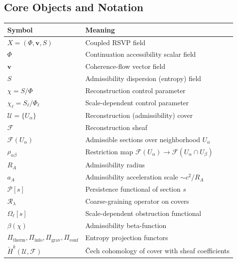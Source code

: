\documentclass[11pt, a4paper]{article}
\theoremstyle{plain}
\theoremstyle{definition}
\theoremstyle{remark}
\newcommand{\RA}{R_{\!A}}
\newcommand{\aA}{a_{\!A}}
\newcommand{\sheaf}{\mathcal{F}}
\newcommand{\cover}{\{U_\alpha\}}
\newcommand{\Ucover}{\mathcal{U}}
\newcommand{\Rcoarse}{\mathcal{R}_\lambda}
\newcommand{\Pitherm}{\Pi_{\mathrm{therm}}}
\newcommand{\Piinfo}{\Pi_{\mathrm{info}}}
\newcommand{\Pigrav}{\Pi_{\mathrm{grav}}}
\newcommand{\Piconf}{\Pi_{\mathrm{conf}}}
\newcommand{\Hcech}{\check{H}}
\begin{document}
\newpage

\subsection*{Core Objects and Notation}

\begin{center}
\renewcommand{\arraystretch}{1.4}
\begin{tabular}{@{}lp{9cm}@{}}
\toprule
\textbf{Symbol} & \textbf{Meaning} \\
\midrule
$X = (\Phi, \mathbf{v}, S)$ & Coupled RSVP field \\
$\Phi$ & Continuation accessibility scalar field \\
$\mathbf{v}$ & Coherence-flow vector field \\
$S$ & Admissibility dispersion (entropy) field \\
$\chi = S/\Phi$ & Reconstruction control parameter \\
$\chi_\ell = S_\ell/\Phi_\ell$ & Scale-dependent control parameter \\
$\Ucover = \cover$ & Reconstruction (admissibility) cover \\
$\sheaf$ & Reconstruction sheaf \\
$\sheaf(U_\alpha)$ & Admissible sections over neighborhood $U_\alpha$ \\
$\rho_{\alpha\beta}$ & Restriction map $\sheaf(U_\alpha) \to \sheaf(U_\alpha \cap U_\beta)$ \\
$\RA$ & Admissibility radius \\
$\aA$ & Admissibility acceleration scale $\sim c^2/\RA$ \\
$\mathcal{P}[s]$ & Persistence functional of section $s$ \\
$\Rcoarse$ & Coarse-graining operator on covers \\
$\Omega_\ell[s]$ & Scale-dependent obstruction functional \\
$\beta(\chi)$ & Admissibility beta-function \\
$\Pitherm,\Piinfo,\Pigrav,\Piconf$ & Entropy projection functors \\
$\Hcech^k(\Ucover, \sheaf)$ & \v{C}ech cohomology of cover with sheaf coefficients \\
\bottomrule
\end{tabular}
\end{center}

\newpage
\tableofcontents
\newpage
\end{document}
